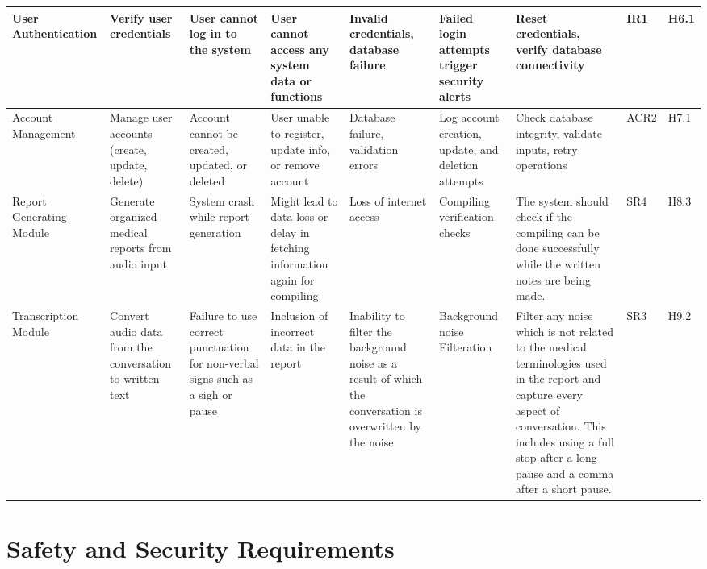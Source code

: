 \documentclass{article}
\begin{document}
\begin{landscape}
\begin{longtable}{|p{1.5cm}|p{2cm}|p{2.6cm}|p{2cm}|p{2cm}|p{2cm}|p{3.5cm}|p{1cm}|p{0.8cm}|}
        \midrule
        User Authentication & \raggedright Verify user credentials & \raggedright User cannot log in to the system & \raggedright User cannot access any system data or functions & \raggedright Invalid credentials, database failure & \raggedright Failed login attempts trigger security alerts & \raggedright Reset credentials, verify database connectivity & IR1 & H6.1 \\
        \midrule
        Account Management & \raggedright Manage user accounts (create, update, delete) & \raggedright Account cannot be created, updated, or deleted & \raggedright User unable to register, update info, or remove account & \raggedright Database failure, validation errors & \raggedright Log account creation, update, and deletion attempts & \raggedright Check database integrity, validate inputs, retry operations & ACR2 & H7.1 \\ 
        \midrule
        Report Generating Module & \raggedright Generate organized medical reports from audio input & \raggedright System crash while report generation & \raggedright Might lead to data loss or delay in fetching information again for compiling & \raggedright Loss of internet access & \raggedright Compiling verification checks & \raggedright The system should check if the compiling can be done successfully while the written notes are being made. & SR4 & H8.3 \\
        \midrule
        Transcription Module & \raggedright Convert audio data from the conversation to written text & \raggedright Failure to use correct punctuation for non-verbal signs such as a sigh or pause & \raggedright Inclusion of incorrect data in the report & \raggedright Inability to filter the background noise as a result of which the conversation is overwritten by the noise & \raggedright Background noise Filteration & \raggedright Filter any noise which is not related to the medical terminologies used in the report and capture every aspect of conversation. This includes using a full stop after a long pause and a comma after a short pause. & SR3 & H9.2 \\ 
        \bottomrule
    \end{longtable}
\end{landscape}

\section{Safety and Security Requirements}
\end{document}
